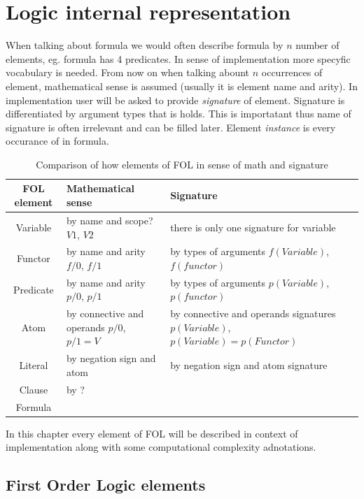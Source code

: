 \chapter{Logic internal representation}

When talking about formula we would often describe formula by $n$ number of elements, eg. formula has 4 predicates. In sense of implementation more specyfic vocabulary is needed. From now on when talking abount $n$ occurrences of element, mathematical sense is assumed (usually it is element name and arity). In implementation user will be asked to provide \textit{signature} of element. Signature is differentiated by argument types that is holds. This is importatant thus name of signature is often irrelevant and can be filled later. Element \textit{instance} is every occurance of in formula.

\begin{table}
  \centering
  \small
  \begin{tabularx}{\textwidth}{|c|X|X|}
    \hline
    FOL element & Mathematical sense & Signature \\
    \hline
    Variable & by name and scope? $V1$, $V2$ & there is only one signature for variable \\  
    \hline
    Functor & by name and arity $f/0$, $f/1$ & by types of arguments $f(Variable)$, $f(functor)$ \\
    \hline
    Predicate & by name and arity $p/0$, $p/1$ & by types of arguments $p(Variable)$, $p(functor)$ \\
    \hline
    Atom & by connective and operands $p/0$, $p/1 = V$ & by connective and operands signatures $p(Variable)$, $p(Variable) = p(Functor)$ \\
    \hline
    Literal & by negation sign and atom & by negation sign and atom signature \\
    \hline
    Clause & by ? & \\
    \hline
    Formula & & \\
    \hline
  \end{tabularx}
  \caption{Comparison of how elements of FOL in sense of math and signature}
\end{table}


In this chapter every element of \gls{FOL} will be described in context of implementation along with some computational complexity adnotations.

\section{First Order Logic elements}

